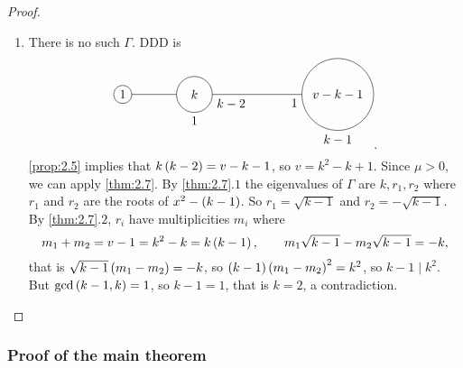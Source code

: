 \begin{proof}
\begin{enumerate}[leftmargin=0.5in, label=Step \arabic*.]
\item There is no such $ \Gamma $. DDD is
$$
\begin{tikzpicture}
\draw (0, 0) circle (0.25) node{$ 1 $};
\draw (2, 0) circle (0.5) node{$ k $};
\draw (6, 0) circle (1) node{$ v - k - 1 $};
\draw (0.25, 0) to (1.5, 0);
\draw (2.5, 0) node[below right]{$ k - 2 $} to (5, 0) node[below left]{$ 1 $};
\draw (2, -0.5) node[below]{$ 1 $};
\draw (6, -1) node[below]{$ k - 1 $};
\end{tikzpicture}.
$$
\ref{prop:2.5} implies that $ k\br{k - 2} = v - k - 1 $, so $ v = k^2 - k + 1 $. Since $ \mu > 0 $, we can apply \ref{thm:2.7}. By \ref{thm:2.7}.$ 1 $ the eigenvalues of $ \Gamma $ are $ k, r_1, r_2 $ where $ r_1 $ and $ r_2 $ are the roots of $ x^2 - \br{k - 1} $. So $ r_1 = \sqrt{k - 1} $ and $ r_2 = -\sqrt{k - 1} $. By \ref{thm:2.7}.$ 2 $, $ r_i $ have multiplicities $ m_i $ where
$$ m_1 + m_2 = v - 1 = k^2 - k = k\br{k - 1}, \qquad m_1\sqrt{k - 1} - m_2\sqrt{k - 1} = -k, $$
that is $ \sqrt{k - 1}\br{m_1 - m_2} = -k $, so $ \br{k - 1}\br{m_1 - m_2}^2 = k^2 $, so $ k - 1 \mid k^2 $. But $ \gcd\br{k - 1, k} = 1 $, so $ k - 1 = 1 $, that is $ k = 2 $, a contradiction.
\end{enumerate}
\end{proof}

\subsubsection{Proof of the main theorem}

